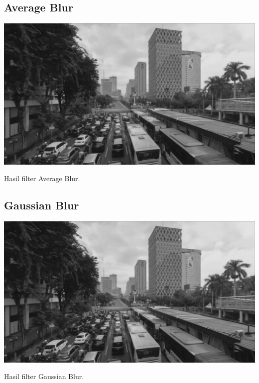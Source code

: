\subsection{Average Blur}
\blindtext
\begin{afigure}
    \includegraphics[width=\linewidth, center]{images/output-image/input1-averageblur.png}
    \caption{Hasil filter Average Blur.}
    \label{fig:output-averageblur}
\end{afigure}

\subsection{Gaussian Blur}
\blindtext
\begin{afigure}
    \includegraphics[width=\linewidth, center]{images/output-image/input1-gaussianblur.png}
    \caption{Hasil filter Gaussian Blur.}
    \label{fig:output-gaussianblur}
\end{afigure}

